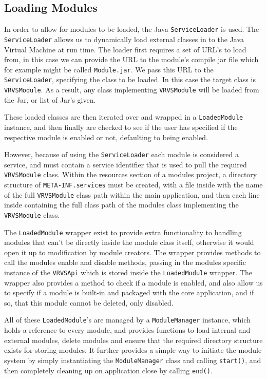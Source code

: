 \subsection{Loading Modules}
In order to allow for modules to be loaded, the Java \texttt{ServiceLoader} is used. The \texttt{ServiceLoader} allows us to dynamically load external classes in to the Java Virtual Machine at run time. The loader first requires a set of URL's to load from, in this case we can provide the URL to the module's compile jar file which for example might be called \texttt{Module.jar}. We pass this URL to the \texttt{ServiceLoader}, specifying the class to be loaded. In this case the target class is \texttt{VRVSModule}. As a result, any class implementing \texttt{VRVSModule} will be loaded from the Jar, or list of Jar's given.

These loaded classes are then iterated over and wrapped in a \texttt{LoadedModule} instance, and then finally are checked to see if the user has specified if the respective module is enabled or not, defaulting to being enabled.

However, because of using the \texttt{ServiceLoader} each module is considered a service, and must contain a service identifier that is used to pull the required \texttt{VRVSModule} class. Within the resources section of a modules project, a directory structure of \verb|META-INF.services| must be created, with a file inside with the name of the full \texttt{VRVSModule} class path within the main application, and then each line inside containing the full class path of the modules class implementing the \texttt{VRVSModule} class.

The \texttt{LoadedModule} wrapper exist to provide extra functionality to handling modules that can't be directly inside the module class itself, otherwise it would open it up to modification by module creators. The wrapper provides methods to call the modules enable and disable methods, passing in the modules specific instance of the \texttt{VRVSApi} which is stored inside the \texttt{LoadedModule} wrapper. The wrapper also provides a method to check if a module is enabled, and also allow us to specify if a module is built-in and packaged with the core application, and if so, that this module cannot be deleted, only disabled.

All of these \texttt{LoadedModule}'s are managed by a \texttt{ModuleManager} instance, which holds a reference to every module, and provides functions to load internal and external modules, delete modules and ensure that the required directory structure exists for storing modules. It further provides a simple way to initiate the module system by simply instantiating the \texttt{ModuleManager} class and calling \verb|start()|, and then completely cleaning up on application close by calling \verb|end()|.

